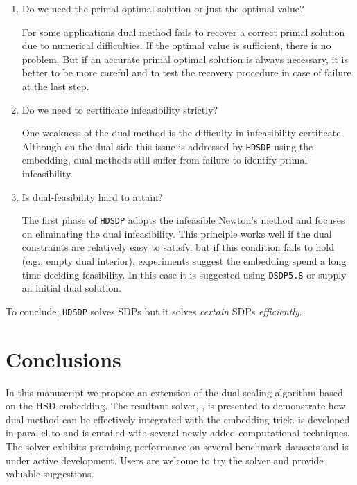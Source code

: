 \documentclass[10pt]{article}
\begin{document}
{\begin{enumerate}
  Many combinatorial problems have formulations friendly to the dual methods.
  Some typical features include (aggregated) sparsity and low-rank structure.
  Dual methods effectively exploit these features by iterating in the dual space and
  using efficient computational tricks. If the problem is dense and most
  constraints are full-rank, dual method has no advantage over the primal-dual
  solvers due to {\textbf{1)}} comparable iteration cost to primal-dual
  methods. {\textbf{2)}} more iterations for convergence.
  
  \item Do we need the primal optimal solution or just the optimal value?
  
  For some applications dual method fails to recover a correct primal solution
  due to numerical difficulties. If the optimal value is sufficient, there is
  no problem. But if an accurate primal optimal solution is always necessary,
  it is better to be more careful and to test the recovery procedure in case
  of failure at the last step.
  
  \item Do we need to certificate infeasibility strictly?
  
  One weakness of the dual method is the difficulty in infeasibility
  certificate. Although on the dual side this issue is addressed by
  {{\texttt{HDSDP}}} using the embedding, dual methods still suffer from
  failure to identify primal infeasibility.
  
  \item Is dual-feasibility hard to attain?
  
  The first phase of {{\texttt{HDSDP}}} adopts the infeasible Newton's method
  and focuses on eliminating the dual infeasibility. This principle works well
  if the dual constraints are relatively easy to satisfy, but if this
  condition fails to hold (e.g., empty dual interior), experiments suggest the embedding
  spend a long time deciding feasibility. In this case it is suggested using
  {{\texttt{DSDP5.8}}} or supply an initial dual solution.
\end{enumerate}
To conclude, {{\texttt{HDSDP}}} solves SDPs but it solves {{\em certain\/}}
SDPs {{\em efficiently\/}}.
\section{Conclusions}

In this manuscript we propose an extension of the dual-scaling algorithm based on
the HSD embedding. The resultant solver, , is presented to
demonstrate how dual method can be effectively integrated with the embedding
trick.  is developed in parallel to  and
is entailed with several newly added computational techniques. The solver
exhibits promising performance on several benchmark datasets and is under
active development. Users are welcome to try the solver and provide valuable suggestions.
}
\end{document}
